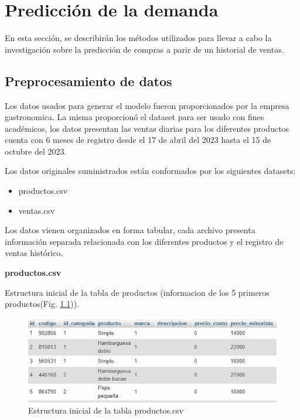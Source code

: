 \fancyhead{}
\fancyfoot{}
\cfoot{\thepage}


\chapter{Predicción de la  demanda}
En esta sección, se describirán los métodos utilizados para llevar a cabo la investigación sobre la predicción de compras a parir de un historial de ventas.

\section{Preprocesamiento de datos}
Los datos usados para generar el modelo fueron proporcionados por la empresa gastronomica. La misma proporcionó el dataset para ser usado con fines académicos, los datos presentan las ventas diarias para los diferentes productos  cuenta con 6 meses de registro desde el 17 de abril del 2023 hasta el 15 de octubre del 2023.

Los datos originales suministrados están conformados por los siguientes datasets: 
\begin{itemize}
  \item productos.csv 
  \item ventas.csv
\end{itemize}

Los datos vienen organizados en forma tabular, cada archivo presenta información separada relacionada con los diferentes productos y el registro de ventas histórico.

\vspace{1\baselineskip}
\textbf{productos.csv}

Estructura inicial de la tabla de productos (informacion de los 5 primeros productos(Fig. \ref{fig:priemeros_5productos})).

\begin{figure}[H]
  \begin{center}
    \includegraphics[scale=0.90]{./tabla_producto.png}
    \caption{Estructura inicial de la tabla productos.csv}
    \label{fig:priemeros_5productos}
  \end{center}
\end{figure}

